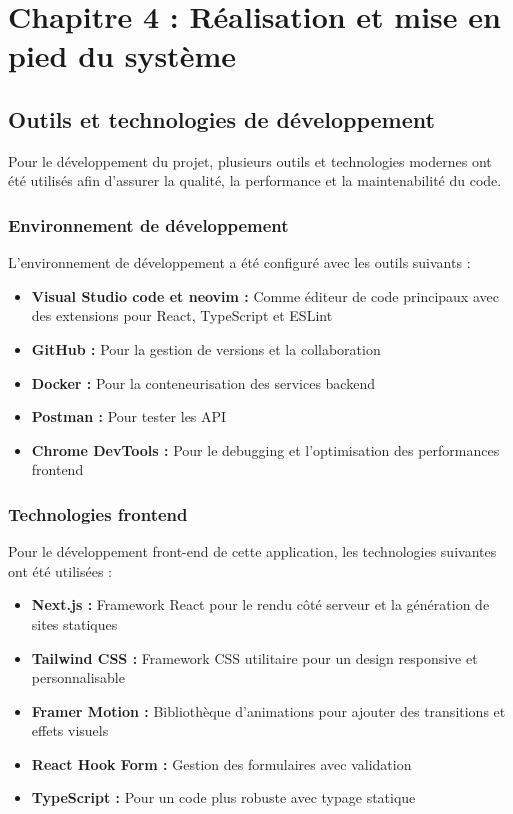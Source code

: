 \chapter*{Chapitre 4 : Réalisation et mise en pied du système}
\thispagestyle{fancy}
\setcounter{section}{0}
\newpage

\section{Outils et technologies de développement}
Pour le développement du projet, plusieurs outils et technologies modernes ont été utilisés afin d'assurer la qualité, la performance et la maintenabilité du code.

\subsection{Environnement de développement}
L'environnement de développement a été configuré avec les outils suivants :
\begin{itemize}
  \item \textbf{Visual Studio code et neovim :} Comme éditeur de code principaux avec des extensions pour React, TypeScript et ESLint
  \item \textbf{GitHub :} Pour la gestion de versions et la collaboration
  \item \textbf{Docker :} Pour la conteneurisation des services backend
  \item \textbf{Postman :} Pour tester les API
  \item \textbf{Chrome DevTools :} Pour le debugging et l'optimisation des performances frontend
\end{itemize}

\subsection{Technologies frontend}
Pour le développement front-end de cette application, les technologies suivantes ont été utilisées :
\begin{itemize}
  \item \textbf{Next.js :} Framework React pour le rendu côté serveur et la génération de sites statiques
  \item \textbf{Tailwind CSS :} Framework CSS utilitaire pour un design responsive et personnalisable
  \item \textbf{Framer Motion :} Bibliothèque d'animations pour ajouter des transitions et effets visuels
  \item \textbf{React Hook Form :} Gestion des formulaires avec validation
  \item \textbf{TypeScript :} Pour un code plus robuste avec typage statique
\end{itemize}


